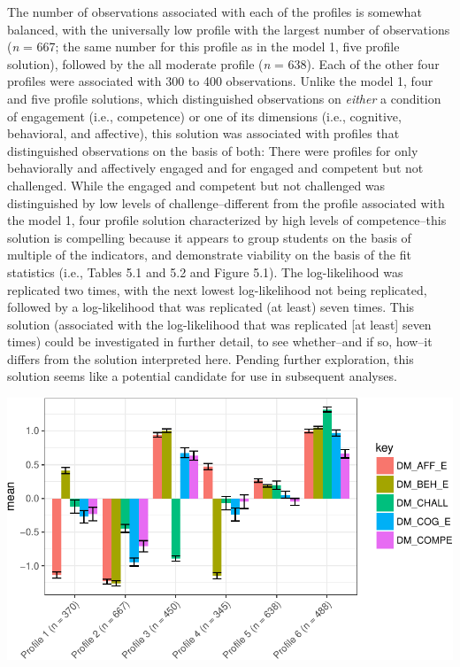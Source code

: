\documentclass[]{book}
\theoremstyle{definition}
\theoremstyle{definition}
\theoremstyle{definition}
\theoremstyle{remark}
\begin{document}
The number of observations associated with each of the profiles is
somewhat balanced, with the universally low profile with the largest
number of observations (\emph{n} = 667; the same number for this profile
as in the model 1, five profile solution), followed by the all moderate
profile (\emph{n} = 638). Each of the other four profiles were
associated with 300 to 400 observations. Unlike the model 1, four and
five profile solutions, which distinguished observations on
\emph{either} a condition of engagement (i.e., competence) or one of its
dimensions (i.e., cognitive, behavioral, and affective), this solution
was associated with profiles that distinguished observations on the
basis of both: There were profiles for only behaviorally and affectively
engaged and for engaged and competent but not challenged. While the
engaged and competent but not challenged was distinguished by low levels
of challenge--different from the profile associated with the model 1,
four profile solution characterized by high levels of competence--this
solution is compelling because it appears to group students on the basis
of multiple of the indicators, and demonstrate viability on the basis of
the fit statistics (i.e., Tables 5.1 and 5.2 and Figure 5.1). The
log-likelihood was replicated two times, with the next lowest
log-likelihood not being replicated, followed by a log-likelihood that
was replicated (at least) seven times. This solution (associated with
the log-likelihood that was replicated {[}at least{]} seven times) could
be investigated in further detail, to see whether--and if so, how--it
differs from the solution interpreted here. Pending further exploration,
this solution seems like a potential candidate for use in subsequent
analyses.

\begin{center}\includegraphics[width=0.8\linewidth]{rosenberg-dissertation_files/figure-latex/m1_6p-1} \end{center}
\end{document}
